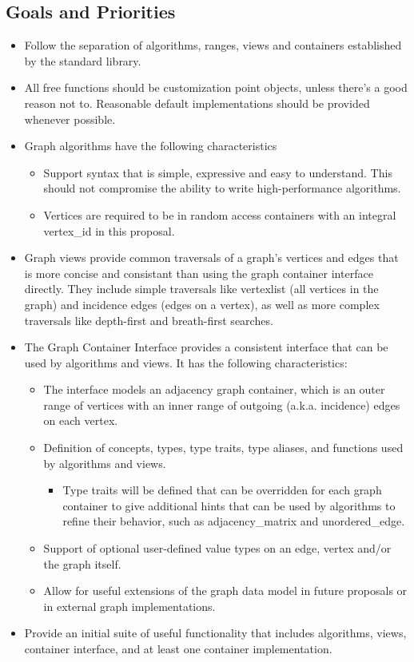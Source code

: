 \subsection{Goals and Priorities}
\begin{itemize}
\item Follow the separation of algorithms, ranges, views and containers established by the standard library.
\item All free functions should be customization point objects, unless there's a good reason not to. Reasonable default implementations should be provided whenever possible.
\item Graph algorithms have the following characteristics
\begin{itemize}
\item Support syntax that is simple, expressive and easy to understand. This should not compromise the ability to write high-performance algorithms.
\item Vertices are required to be in random access containers with an integral vertex\_id in this proposal.
\end{itemize}
\item Graph views provide common traversals of a graph's vertices and edges that is more concise and consistant than using the graph container interface directly. They include simple traversals like vertexlist (all vertices in the graph) and incidence edges (edges on a vertex), as well as more complex traversals like depth-first and breath-first searches.
\item The Graph Container Interface provides a consistent interface that can be used by algorithms and views. It has the following characteristics:
\begin{itemize}
\item The interface models an adjacency graph container, which is an outer range of vertices with an inner range of outgoing (a.k.a. incidence) edges on each vertex. 
\item Definition of concepts, types, type traits, type aliases, and functions used by algorithms and views.
\begin{itemize}
\item Type traits will be defined that can be overridden for each graph container to give additional hints that can be used by algorithms to refine their behavior, such as adjacency\_matrix and unordered\_edge.
\end{itemize}
\item Support of optional user-defined value types on an edge, vertex and/or the graph itself.
\item Allow for useful extensions of the graph data model in future proposals or in external graph implementations. 
\end{itemize}
\item Provide an initial suite of useful functionality that includes algorithms, views, container interface, and at least one container implementation.
\end{itemize}

